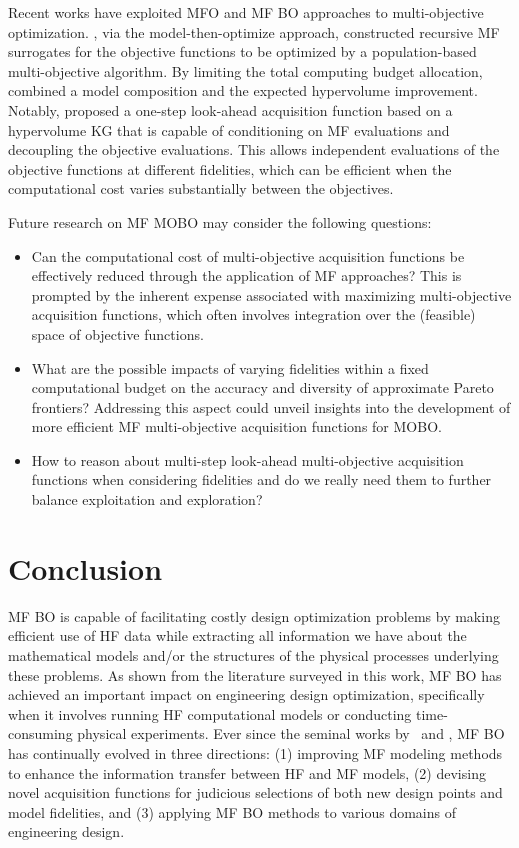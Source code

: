 \documentclass[journal ]{new-aiaa}
\begin{document}
	Recent works have exploited MFO and MF BO approaches to multi-objective optimization.
	\citet{Singh2017}, via the model-then-optimize approach, constructed recursive MF surrogates for the objective functions to be optimized by a population-based multi-objective algorithm. 
	By limiting the total computing budget allocation, \citet{Khatamsaz2021aiaa} combined a model composition and the expected hypervolume improvement.
	Notably, \citet{Daulton2023} proposed a one-step look-ahead
	acquisition function based on a hypervolume KG that is capable of conditioning on MF evaluations and decoupling the objective evaluations.
	This allows independent evaluations of the objective functions at different fidelities, which can be efficient when the computational cost varies substantially between the objectives.
	
	Future research on MF MOBO may consider the following questions:
	\begin{itemize}
		\item Can the computational cost of multi-objective acquisition functions be effectively reduced through the application of MF approaches? This is prompted by the inherent expense associated with maximizing multi-objective acquisition functions, which often involves integration over the (feasible) space of objective functions.
		
		\item What are the possible impacts of varying fidelities within a fixed computational budget on the accuracy and diversity of approximate Pareto frontiers? Addressing this aspect could unveil insights into the development of more efficient MF multi-objective acquisition functions for MOBO.
		
		\item How to reason about multi-step look-ahead multi-objective acquisition functions when considering fidelities and do we really need them to further balance exploitation and exploration? 
	\end{itemize}
	
	\section{Conclusion}\label{Sec7}
	MF BO is capable of facilitating costly design optimization problems by making efficient use of HF data while extracting all information we have about the mathematical models and/or the structures of the physical processes underlying these problems. 
	As shown from the literature surveyed in this work, MF BO has achieved an important impact on engineering design optimization, specifically when it involves running HF computational models or conducting time-consuming physical experiments.
	Ever since the seminal works by~\citet{Huang2006smo} and \citet{Forrester2007}, MF BO has continually evolved in three directions: (1) improving MF modeling methods to enhance the information transfer between HF and MF models, (2) devising novel acquisition functions for judicious selections of both new design points and model fidelities, and (3) applying MF BO methods to various domains of engineering design.
	
\end{document}
